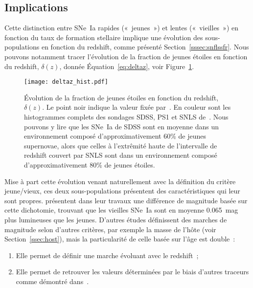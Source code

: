 \documentclass[../main/main.tex]{subfiles}
\begin{document}
\subsection{Implications}\label{ssec:ageimpl}

Cette distinction entre SNe~Ia rapides («~jeunes~») et lentes («~vieilles~») en
fonction du taux de formation stellaire implique une évolution des
sous-populations en fonction du redshift, comme présenté
Section~\ref{sssec:snflssfr}. Nous pouvons notamment tracer l'évolution de la
fraction de jeunes étoiles en fonction du redshift, $\delta(z)$, donnée
Équation~\ref{eq:deltaz}, voir Figure~\ref{fig:deltaz}.

\begin{figure}[ht]
    \centering
    \texttt{[image: deltaz\_hist.pdf]}
    \caption[Évolution de la fraction de jeunes étoiles en fonction du redshift,
    $\delta(z)$.]{Évolution de la fraction de jeunes étoiles en fonction du
        redshift, $\delta(z)$. Le point noir indique la valeur fixée
        par~\cite{rigault2020}. En couleur sont les histogrammes complets des
    sondages SDSS, PS1 et SNLS de~\cite{scolnic2018}. Nous pouvons y lire que
les SNe~Ia de SDSS sont en moyenne dans un environnement composé
d'approximativement 60\% de jeunes supernovae, alors que celles à l'extrêmité
haute de l'intervalle de redshift couvert par SNLS sont dans un environnement
composé d'approximativement 80\% de jeunes étoiles.}
    \label{fig:deltaz}
\end{figure}

Mise à part cette évolution venant naturellement avec la définition du critère
jeune/vieux, ces deux sous-populations présentent des caractéristiques qui leur
sont propres. \cite{rigault2020} présentent dans leur travaux une différence de
magnitude basée sur cette dichotomie, trouvant que les vieilles SNe~Ia sont en
moyenne \SI{0.065}{mag} plus lumineuses que les jeunes. D'autres études
définissent des marches de magnitude selon d'autres critères, par exemple la
masse de l'hôte (voir Section~\ref{ssec:host}), mais la particularité de celle
basée sur l'âge est double~:
\begin{enumerate}
    \item Elle permet de définir une marche évoluant avec le redshift~;
    \item Elle permet de retrouver les valeurs déterminées par le biais d'autres
        traceurs comme démontré dans~\cite{briday2022}.
\end{enumerate}
\end{document}
